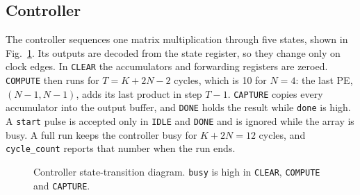 
\subsection{Controller}
The controller sequences one matrix multiplication through five states, shown in Fig.~\ref{fig:fsm}. Its outputs are decoded from the state register, so they change only on clock edges. In \texttt{CLEAR} the accumulators and forwarding registers are zeroed. \texttt{COMPUTE} then runs for $T = K + 2N - 2$ cycles, which is 10 for $N = 4$: the last PE, $(N{-}1, N{-}1)$, adds its last product in step $T-1$. \texttt{CAPTURE} copies every accumulator into the output buffer, and \texttt{DONE} holds the result while \texttt{done} is high. A \texttt{start} pulse is accepted only in \texttt{IDLE} and \texttt{DONE} and is ignored while the array is busy. A full run keeps the controller busy for $K + 2N = 12$ cycles, and \texttt{cycle\_count} reports that number when the run ends.

\begin{figure}[t]
\centering
{}
\caption{Controller state-transition diagram. \texttt{busy} is high in \texttt{CLEAR}, \texttt{COMPUTE} and \texttt{CAPTURE}.}
\label{fig:fsm}
\end{figure}
